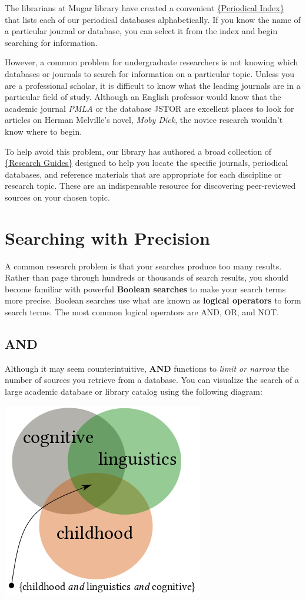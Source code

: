 \documentclass[book]{memoir}
\begin{document}
The librarians at Mugar library have created a convenient \href{http://www.bu.edu/dbin/ejournals/esources/alpha-es.php}{\{Periodical Index\}} that lists each of our periodical databases alphabetically. If you know the name of a particular journal or database, you can select it from the index and begin searching for information.

However, a common problem for undergraduate researchers is not knowing which databases or journals to search for information on a particular topic. Unless you are a professional scholar, it is difficult to know what the leading journals are in a particular field of study. Although an English professor would know that the academic journal \emph{PMLA} or the database JSTOR are excellent places to look for articles on Herman Melville's novel, \emph{Moby Dick}, the novice research wouldn't know where to begin. 

To help avoid this problem, our library has authored a broad collection of \href{http://www.bu.edu/library/research/guides/research-guides}{\{Research Guides\}} designed to help you locate the specific journals, periodical databases, and reference materials that are appropriate for each discipline or research topic. These are an indispensable resource for discovering peer-reviewed sources on your chosen topic. 

\section{Searching with Precision}

A common research problem is that your searches produce too many results. Rather than page through hundreds or thousands of search results, you should become familiar with powerful \textbf{Boolean searches} to make your search terms more precise. Boolean searches use what are known as \textbf{logical operators} to form search terms. The most common logical operators are AND, OR, and NOT. 

\subsection{AND}

Although it may seem counterintuitive, \textbf{AND} functions to \emph{limit or narrow} the number of sources you retrieve from a database. You can visualize the search of a large academic database or library catalog using the following diagram:
 
\begin{center}
\includegraphics[width=.45\textwidth]{and3colors.png}
\end{center}
\end{document}

